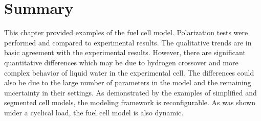 \section{Summary}

This chapter provided examples of the fuel cell model.  Polarization tests were performed and compared to experimental results.  The qualitative trends are in basic agreement with the experimental results.  However, there are significant quantitative differences which may be due to hydrogen crossover and more complex behavior of liquid water in the experimental cell.  The differences could also be due to the large number of parameters in the model and the remaining uncertainty in their settings.  As demonstrated by the examples of simplified and segmented cell models, the modeling framework is reconfigurable.  As was shown under a cyclical load, the fuel cell model is also dynamic.

